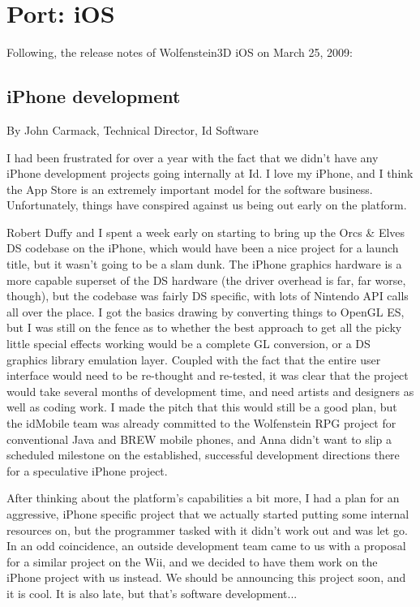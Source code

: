 \section{Port: iOS}
Following, the release notes of Wolfenstein3D iOS on March 25, 2009:

\subsection{iPhone development}

By John Carmack, Technical Director, Id Software\\
\par

I had been frustrated for over a year with the fact that we didn't have any iPhone development projects going internally at Id.  I love my iPhone, and I think the App Store is an extremely important model for the software business.  Unfortunately, things have conspired against us being out early on the platform.\\
\par

Robert Duffy and I spent a week early on starting to bring up the Orcs \& Elves DS codebase on the iPhone, which would have been a nice project for a launch title, but it wasn't going to be a slam dunk.  The iPhone graphics hardware is a more capable superset of the DS hardware (the driver overhead is far, far worse, though), but the codebase was fairly DS specific, with lots of Nintendo API calls all over the place.  I got the basics drawing by converting things to OpenGL ES, but I was still on the fence as to whether the best approach to get all the picky little special effects working would be a complete GL conversion, or a DS graphics library emulation layer.  Coupled with the fact that the entire user interface would need to be re-thought and re-tested, it was clear that the project would take several months of development time, and need artists and designers as well as coding work.  I made the pitch that this would still be a good plan, but the idMobile team was already committed to the Wolfenstein RPG project for conventional Java and BREW mobile phones, and Anna didn't want to slip a scheduled milestone on the established, successful development directions there for a speculative iPhone project.\\
\par

After thinking about the platform's capabilities a bit more, I had a plan for an aggressive, iPhone specific project that we actually started putting some internal resources on, but the programmer tasked with it didn't work out and was let go.  In an odd coincidence, an outside development team came to us with a proposal for a similar project on the Wii, and we decided to have them work on the iPhone project with us instead.  We should be announcing this project soon, and it is cool.  It is also late, but that's software development...\\
\par

